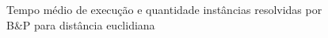 \begin{figure}[t]%
    \centering
    \caption{Tempo médio de execução e quantidade instâncias resolvidas por B\&P para distância euclidiana}%
    \label{fig:time_inst_den-sf2_sf3-euclidean}%
\end{figure}

